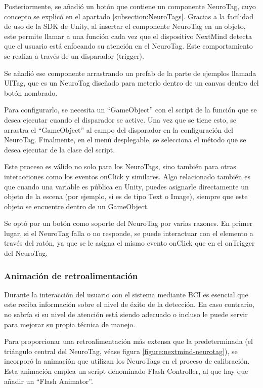 Posteriormente, se añadió un botón que contiene un componente NeuroTag, cuyo concepto se explic\'o en el apartado \ref{subsection:NeuroTags}. Gracias a la facilidad de uso de la SDK de Unity, al insertar el componente NeuroTag en un objeto, este permite llamar a una función cada vez que el dispositivo NextMind detecta que el usuario está enfocando su atención en el NeuroTag. Este comportamiento se realiza a través de un disparador (trigger).



Se añadió ese componente arrastrando un prefab de la parte de ejemplos llamada UITag, que es un NeuroTag diseñado para meterlo dentro de un canvas dentro del botón nombrado.



Para configurarlo, se necesita un ``GameObject'' con el script de la función que se desea ejecutar cuando el disparador se active. Una vez que se tiene esto, se arrastra el ``GameObject'' al campo del disparador en la configuración del NeuroTag. Finalmente, en el menú desplegable, se selecciona el método que se desea ejecutar de la clase del script.



Este proceso es válido no solo para los NeuroTags, sino también para otras interacciones como los eventos onClick y similares. Algo relacionado también es que cuando una variable es pública en Unity, puedes asignarle directamente un objeto de la escena (por ejemplo, si es de tipo Text o Image), siempre que este objeto se encuentre dentro de un GameObject.



Se optó por un botón como soporte del NeuroTag por varias razones. En primer lugar, si el NeuroTag falla o no responde, se puede interactuar con el elemento a través del ratón, ya que se le asigna el mismo evento onClick que en el onTrigger del NeuroTag.

\subsubsection{Animación de retroalimentación}

Durante la interacci\'on del usuario con el sistema mediante BCI es esencial que este reciba informaci\'on sobre el nivel de \'exito de la detecci\'on. En caso contrario, no sabr\'ia si su nivel de atenci\'on est\'a siendo adecuado o incluso le puede servir para mejorar su propia t\'ecnica de manejo. 



Para proporcionar una retroalimentación más extensa que la predeterminada (el triángulo central del NeuroTag, véase figura \ref{figure:nextmind-neurotag}), se incorporó la animación que utilizan los NeuroTags en el proceso de calibración. Esta animación emplea un script denominado Flash Controller, al que hay que añadir un ``Flash Animator''.



